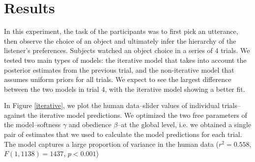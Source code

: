 \documentclass[10pt,a4paper]{article}
\begin{document}

\section{Results}

In this experiment, the task of the participants was to first pick an utterance, then observe the choice of an object and ultimately infer the hierarchy of the listener's preferences. Subjects watched an object choice in a series of 4 trials. We tested two main types of models: the iterative model that takes into account the posterior estimates from the previous trial, and the non-iterative model that assumes uniform priors for all trials. We expect to see the largest difference between the two models in trial 4, with the iterative model showing a better fit.

In Figure \ref{iterative}, we plot the human data--slider values of individual trials--against the iterative model predictions. We optimized the two free parameters of the model--softness $\gamma$ and obedience $\beta$--at the global level, i.e. we obtained a single pair of estimates that we used to calculate the model predictions for each trial. The model captures a large proportion of variance in the human data  ($r^2=0.558$, $F(1,1138) = 1437$, $p<0.001$)
\end{document}
